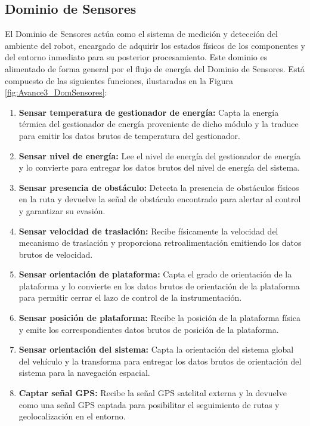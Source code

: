 \documentclass[../../General.tex]{subfiles}
\begin{document}
\subsection{Dominio de Sensores}
El Dominio de Sensores actúa como el sistema de medición y detección del ambiente del robot, encargado de adquirir los estados físicos de los componentes y del entorno inmediato para su posterior procesamiento. Este dominio es alimentado de forma general por el flujo de energía del Dominio de Sensores. Está compuesto de las siguientes funciones, ilustaradas en la Figura \ref{fig:Avance3_DomSensores}:
\begin{enumerate}
	\item \textbf{Sensar temperatura de gestionador de energía:} Capta la energía térmica del gestionador de energía proveniente de dicho módulo y la traduce para emitir los datos brutos de temperatura del gestionador.
	\item \textbf{Sensar nivel de energía:} Lee el nivel de energía del gestionador de energía y lo convierte para entregar los datos brutos del nivel de energía del sistema.
	\item \textbf{Sensar presencia de obstáculo:} Detecta la presencia de obstáculos físicos en la ruta y devuelve la señal de obstáculo encontrado para alertar al control y garantizar su evasión.
	\item \textbf{Sensar velocidad de traslación:} Recibe físicamente la velocidad del mecanismo de traslación y proporciona retroalimentación emitiendo los datos brutos de velocidad.
	\item \textbf{Sensar orientación de plataforma:} Capta el grado de orientación de la plataforma y lo convierte en los datos brutos de orientación de la plataforma para permitir cerrar el lazo de control de la instrumentación.
	\item \textbf{Sensar posición de plataforma:} Recibe la posición de la plataforma física y emite los correspondientes datos brutos de posición de la plataforma.
	\item \textbf{Sensar orientación del sistema:} Capta la orientación del sistema global del vehículo y la transforma para entregar los datos brutos de orientación del sistema para la navegación espacial.
	\item \textbf{Captar señal GPS:} Recibe la señal GPS satelital externa y la devuelve como una señal GPS captada para posibilitar el seguimiento de rutas y geolocalización en el entorno.
\end{enumerate}
\end{document}
